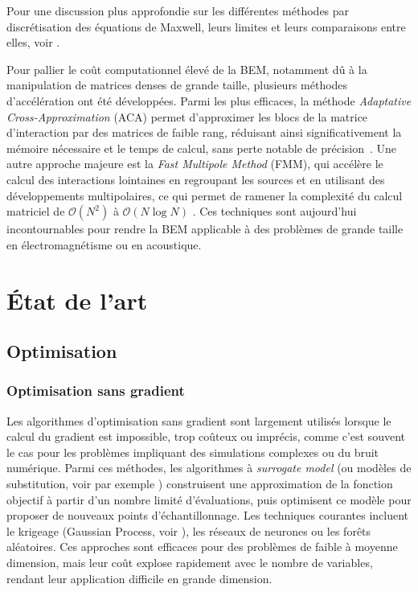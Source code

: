 Pour une discussion plus approfondie sur les différentes méthodes par discrétisation des équations de Maxwell, leurs limites et leurs comparaisons entre elles, voir \cite{Davidson2010}.


Pour pallier le coût computationnel élevé de la BEM, notamment dû à la manipulation de matrices denses de grande taille, plusieurs méthodes d'accélération ont été développées. Parmi les plus efficaces, la méthode \textit{Adaptative Cross-Approximation} (ACA) permet d'approximer les blocs de la matrice d'interaction par des matrices de faible rang, réduisant ainsi significativement la mémoire nécessaire et le temps de calcul, sans perte notable de précision~\citep{Bebendorf2000}. Une autre approche majeure est la \textit{Fast Multipole Method} (FMM), qui accélère le calcul des interactions lointaines en regroupant les sources et en utilisant des développements multipolaires, ce qui permet de ramener la complexité du calcul matriciel de $\mathcal{O}(N^2)$ à $\mathcal{O}(N\log N)$ \citep{Greengard1988}. Ces techniques sont aujourd'hui incontournables pour rendre la BEM applicable à des problèmes de grande taille en électromagnétisme ou en acoustique.



\section{\'Etat de l'art}
\subsection{Optimisation}
\subsubsection{Optimisation sans gradient}

Les algorithmes d'optimisation sans gradient sont largement utilisés lorsque le calcul du gradient est impossible, trop coûteux ou imprécis, comme c'est souvent le cas pour les problèmes impliquant des simulations complexes ou du bruit numérique. Parmi ces méthodes, les algorithmes à \textit{surrogate model} (ou modèles de substitution, voir par exemple \cite{Queipo2005,Forrester2008,Forrester2007,Jin2011}) construisent une approximation de la fonction objectif à partir d'un nombre limité d'évaluations, puis optimisent ce modèle pour proposer de nouveaux points d'échantillonnage. Les techniques courantes incluent le krigeage (Gaussian Process, voir \cite{Santner2003,Krige1951,Jones1998}), les réseaux de neurones ou les forêts aléatoires. Ces approches sont efficaces pour des problèmes de faible à moyenne dimension, mais leur coût explose rapidement avec le nombre de variables, rendant leur application difficile en grande dimension.

